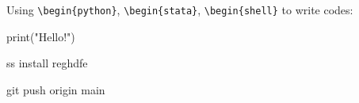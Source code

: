 \documentclass[12pt]{report}
\begin{document}
\no Using \verb=\begin{python}=, \verb=\begin{stata}=, \verb=\begin{shell}= to write codes:
\begin{python}
    print("Hello!")
\end{python}

\begin{stata}
    ss install reghdfe
\end{stata}

\begin{shell}
    git push origin main
\end{shell}

\newpage
\listoffigures

\newpage
\listofalgorithms



\end{document}
